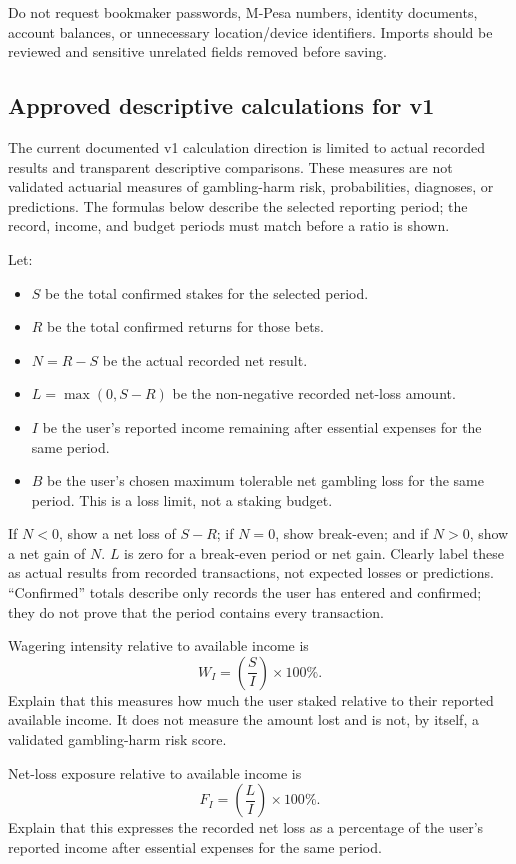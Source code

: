 \documentclass[11pt,a4paper]{article}
\begin{document}
Do not request bookmaker passwords, M-Pesa numbers, identity documents, account balances, or unnecessary location/device identifiers. Imports should be reviewed and sensitive unrelated fields removed before saving.

\subsection{Approved descriptive calculations for v1}
The current documented v1 calculation direction is limited to actual recorded
results and transparent descriptive comparisons. These measures are not
validated actuarial measures of gambling-harm risk, probabilities, diagnoses,
or predictions. The formulas below describe the selected reporting period;
the record, income, and budget periods must match before a ratio is shown.

Let:
\begin{itemize}
  \item \(S\) be the total confirmed stakes for the selected period.
  \item \(R\) be the total confirmed returns for those bets.
  \item \(N = R - S\) be the actual recorded net result.
  \item \(L = \max(0, S - R)\) be the non-negative recorded net-loss amount.
  \item \(I\) be the user's reported income remaining after essential expenses for the same period.
  \item \(B\) be the user's chosen maximum tolerable net gambling loss for the same period. This is a loss limit, not a staking budget.
\end{itemize}
If \(N < 0\), show a net loss of \(S-R\); if \(N=0\), show break-even; and if \(N>0\), show a net gain of \(N\). \(L\) is zero for a break-even period or net gain. Clearly label these as actual results from recorded transactions, not expected losses or predictions. “Confirmed” totals describe only records the user has entered and confirmed; they do not prove that the period contains every transaction.

Wagering intensity relative to available income is
\[
W_I = \left(\frac{S}{I}\right)\times 100\%.
\]
Explain that this measures how much the user staked relative to their reported available income. It does not measure the amount lost and is not, by itself, a validated gambling-harm risk score.

Net-loss exposure relative to available income is
\[
F_I = \left(\frac{L}{I}\right)\times 100\%.
\]
Explain that this expresses the recorded net loss as a percentage of the user's reported income after essential expenses for the same period.
\end{document}

